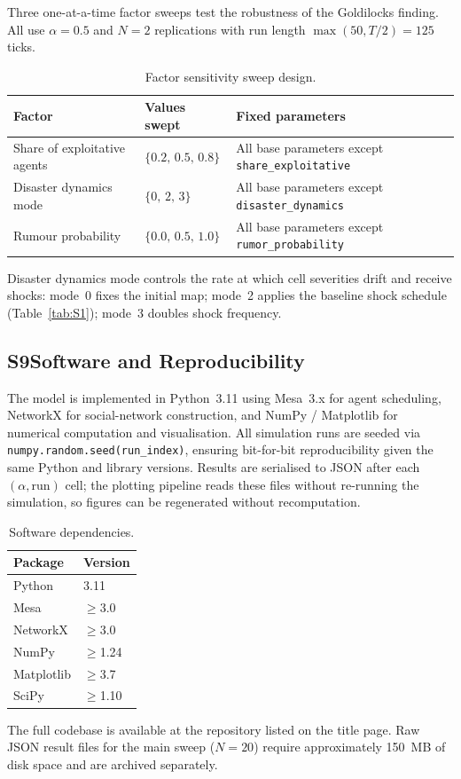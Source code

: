 Three one-at-a-time factor sweeps test the robustness of the Goldilocks finding.
All use $\alpha=0.5$ and $N=2$ replications with run length
$\max(50,T/2)=125$ ticks.

\begin{table}[h]
\centering
\caption{Factor sensitivity sweep design.}
\label{tab:S8}
\begin{tabular}{lll}
\toprule
Factor & Values swept & Fixed parameters \\
\midrule
Share of exploitative agents & $\{0.2,\,0.5,\,0.8\}$
  & All base parameters except \texttt{share\_exploitative} \\
Disaster dynamics mode & $\{0,\,2,\,3\}$
  & All base parameters except \texttt{disaster\_dynamics} \\
Rumour probability & $\{0.0,\,0.5,\,1.0\}$
  & All base parameters except \texttt{rumor\_probability} \\
\bottomrule
\end{tabular}
\end{table}

Disaster dynamics mode controls the rate at which cell severities drift and
receive shocks: mode~0 fixes the initial map; mode~2 applies the baseline shock
schedule (Table~\ref{tab:S1}); mode~3 doubles shock frequency.

\subsection*{S9\quad Software and Reproducibility}

The model is implemented in Python~3.11 using Mesa~3.x for agent scheduling,
NetworkX for social-network construction, and NumPy / Matplotlib for numerical
computation and visualisation.
All simulation runs are seeded via \texttt{numpy.random.seed(run\_index)},
ensuring bit-for-bit reproducibility given the same Python and library versions.
Results are serialised to JSON after each $(\alpha,\mathrm{run})$ cell; the
plotting pipeline reads these files without re-running the simulation, so figures
can be regenerated without recomputation.

\begin{table}[h]
\centering
\caption{Software dependencies.}
\label{tab:S9}
\begin{tabular}{ll}
\toprule
Package & Version \\
\midrule
Python     & 3.11 \\
Mesa       & $\geq$3.0 \\
NetworkX   & $\geq$3.0 \\
NumPy      & $\geq$1.24 \\
Matplotlib & $\geq$3.7 \\
SciPy      & $\geq$1.10 \\
\bottomrule
\end{tabular}
\end{table}

The full codebase is available at the repository listed on the title page.
Raw JSON result files for the main sweep ($N=20$) require approximately 150~MB
of disk space and are archived separately.
